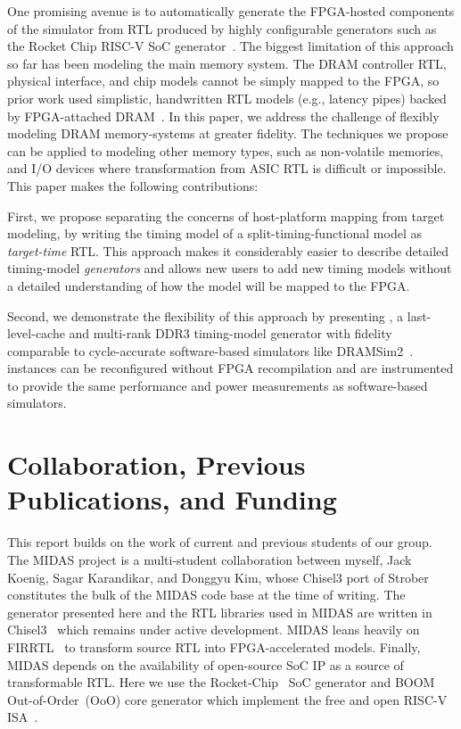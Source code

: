 One promising avenue is to automatically generate the FPGA-hosted
components of the simulator from RTL produced by highly configurable
generators such as the Rocket Chip RISC-V SoC generator~\cite{rocketchip}. The
biggest limitation of this approach so far has been modeling the main
memory system.  The DRAM controller RTL, physical interface, and
chip models cannot be simply mapped to the FPGA, so
prior work used simplistic, handwritten RTL models (e.g.,
latency pipes) backed by FPGA-attached DRAM~\cite{khanms}.
In this paper, we address the challenge of flexibly modeling DRAM
memory-systems at greater fidelity.  The techniques we propose can be
applied to modeling other memory types, such as
non-volatile memories, and I/O devices where transformation from ASIC
RTL is difficult or impossible.  This paper makes the following
contributions:

First, we propose separating the concerns of host-platform mapping
from target modeling, by writing the timing model of a
split-timing-functional model as \emph{target-time} RTL.  This
approach makes it considerably easier to describe detailed
timing-model \emph{generators} and allows new users to add new timing
models without a detailed understanding of how the model will be
mapped to the FPGA.

Second, we demonstrate the flexibility of this approach by presenting \PNAME, a
last-level-cache and multi-rank DDR3 timing-model generator with fidelity comparable to
cycle-accurate software-based simulators like DRAMSim2~\cite{dramsim}. \PNAME
instances can be reconfigured without FPGA recompilation and are instrumented
to provide the same performance and power measurements as software-based
simulators.


\section{Collaboration, Previous Publications, and Funding}

This report builds on the work of current and previous students of our group.
The MIDAS project is a multi-student collaboration between myself, Jack Koenig,
Sagar Karandikar, and Donggyu Kim, whose Chisel3 port of Strober~\cite{strober}
constitutes the bulk of the MIDAS code base at the time of writing. The
generator presented here and the RTL libraries used in MIDAS are written in
Chisel3~\cite{Chisel} which remains under active development. MIDAS leans
heavily on FIRRTL~\cite{firrtl} to transform source RTL into FPGA-accelerated
models.  Finally, MIDAS depends on the availability of open-source SoC IP as a
source of transformable RTL. Here we use the Rocket-Chip~\cite{rocketchip} SoC
generator and BOOM~\cite{boom} Out-of-Order~(OoO) core generator which
implement the free and open RISC-V ISA~\cite{riscv}.

